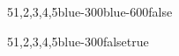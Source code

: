\documentclass[12pt,a4paper]{article}
\begin{document}
\begin{stack}
    {5}{1,2,3,4,5}{blue-300}{blue-600}{false} 
\end{stack}
\vspace*{10mm}

\begin{stack}
    {5}{1,2,3,4,5}{blue-300}{false}{true}
\end{stack}
\end{document}
